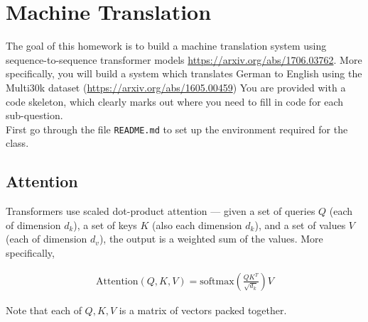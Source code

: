 \documentclass{article}
\theoremstyle{case}
\theoremstyle{definition}
\begin{document}
\newpage
\section{Machine Translation}

The goal of this homework is to build a machine translation system using sequence-to-sequence transformer models \url{https://arxiv.org/abs/1706.03762}. More specifically, you will build a system which translates German to English using the Multi30k dataset (\url{https://arxiv.org/abs/1605.00459}) You are provided with a code skeleton, which clearly marks out where you need to fill in code for each sub-question.\\

First go through the file \texttt{README.md} to set up the environment required for the class.

\subsection{Attention}

Transformers use scaled dot-product attention --- given a set of queries $Q$ (each of dimension $d_k$), a set of keys $K$ (also each dimension $d_k$), and a set of values $V$ (each of dimension $d_v$), the output is a weighted sum of the values. More specifically,

    \begin{align}
        \text{Attention}(Q, K, V) = \text{softmax}(\frac{QK^T}{\sqrt{d_k}})V
    \end{align}

    Note that each of $Q, K, V$ is a matrix of vectors packed together.
\end{document}
